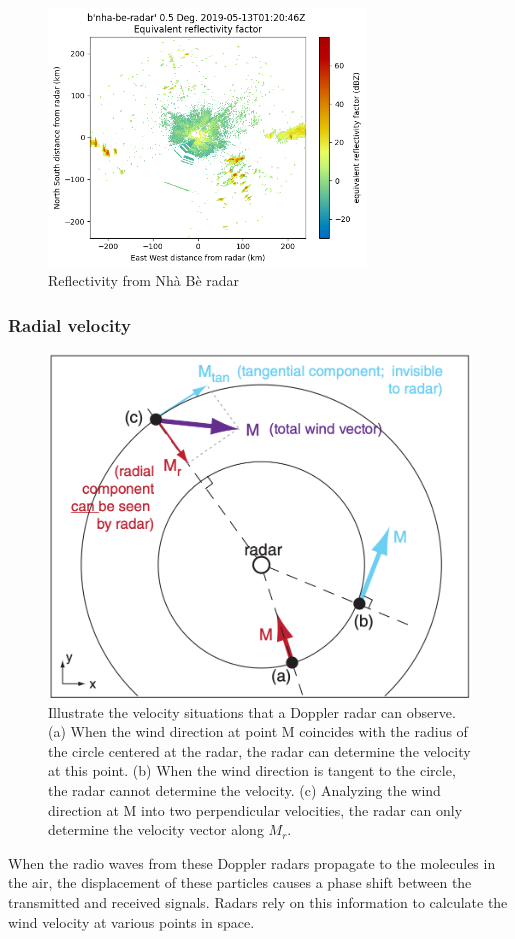 \begin{figure}[H]
    \centering
    \includegraphics[width=0.75\textwidth]{Images/2.1-reflectivity_nhabe.png}
    \vspace{1em}
    \caption{Reflectivity from Nhà Bè radar}
    \label{fig:reflectivity-nhabe}
\end{figure}


\subsubsection{Radial velocity}

\begin{figure}[H]
    \centering
    \includegraphics[width=.55\textwidth]{Images/2.1-radial-velocity.png}
    \vspace{2em}
    \caption{Illustrate the velocity situations that a Doppler radar can observe. (a) When the wind direction at point M coincides with the radius of the circle centered at the radar, the radar can determine the velocity at this point. (b) When the wind direction is tangent to the circle, the radar cannot determine the velocity. (c) Analyzing the wind direction at M into two perpendicular velocities, the radar can only determine the velocity vector along $M_r$.}
    \label{fig:radial-velocity}
\end{figure}

When the radio waves from these Doppler radars propagate to the molecules in the air, the displacement of these particles causes a phase shift between the transmitted and received signals. Radars rely on this information to calculate the wind velocity at various points in space.